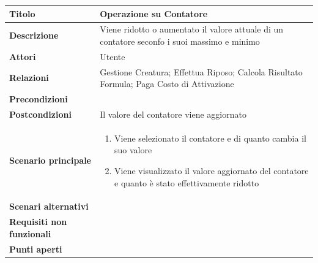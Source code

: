 \documentclass[a4paper, 11pt]{article}
\begin{document}
\begin{center}
\begin{tabular}{ |p{5cm}|p{9.5cm}|  }
\hline
\textbf{Titolo} & Operazione su Contatore \\
\hline
\textbf{Descrizione} & Viene ridotto o aumentato il valore attuale di un contatore seconfo i suoi massimo e minimo \\
\hline
\textbf{Attori} & Utente \\
\hline
\textbf{Relazioni} & Gestione Creatura; Effettua Riposo; Calcola Risultato Formula; Paga Costo di Attivazione \\
\hline
\textbf{Precondizioni} & \\
\hline
\textbf{Postcondizioni} & Il valore del contatore viene aggiornato \\
\hline
\textbf{Scenario principale} & 
\begin{enumerate}
    \item Viene selezionato il contatore e di quanto cambia il suo valore
    \item Viene visualizzato il valore aggiornato del contatore e quanto è stato effettivamente ridotto
\end{enumerate}\\
\hline
\textbf{Scenari alternativi} & \\
\hline
\textbf{Requisiti non funzionali} & \\
\hline
\textbf{Punti aperti} & \\
\hline
\end{tabular}

\vspace{3em}


\end{center}
\end{document}
